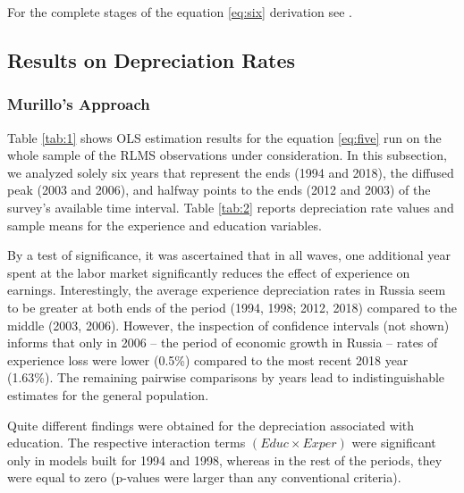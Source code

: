 \documentclass[12pt,a4paper]{article}
\numberwithin{equation}{section}
\begin{document}
For the complete stages of the equation \ref{eq:six} derivation see \parencite{weber_173._2008}.

\subsection{Results on Depreciation Rates}
\subsubsection{Murillo's Approach}

Table \ref{tab:1} shows OLS estimation results for the equation \ref{eq:five} run on the whole sample of the RLMS observations under consideration. In this subsection, we analyzed solely six years that represent the ends (1994 and 2018), the diffused peak (2003 and 2006), and halfway points to the ends (2012 and 2003) of the survey's available time interval. Table \ref{tab:2} reports depreciation rate values and sample means for the experience and education variables.

By a test of significance, it was ascertained that in all waves, one additional year spent at the labor market significantly reduces the effect of experience on earnings. Interestingly, the average experience depreciation rates in Russia seem to be greater at both ends of the period (1994, 1998; 2012, 2018) compared to the middle (2003, 2006). However, the inspection of confidence intervals (not shown) informs that only in 2006  -- the period of economic growth in Russia -- rates of experience loss were lower (0.5\%) compared to the most recent 2018 year (1.63\%). The remaining pairwise comparisons by years lead to indistinguishable estimates for the general population. 

Quite different findings were obtained for the depreciation associated with education. The respective interaction terms $(Educ \times Exper)$ were significant only in models built for 1994 and 1998, whereas in the rest of the periods, they were equal to zero (p-values were larger than any conventional criteria).
\end{document}
